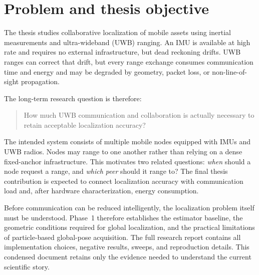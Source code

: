 \section{Problem and thesis objective}

The thesis studies collaborative localization of mobile assets using inertial measurements and ultra-wideband (UWB) ranging. An IMU is available at high rate and requires no external infrastructure, but dead reckoning drifts. UWB ranges can correct that drift, but every range exchange consumes communication time and energy and may be degraded by geometry, packet loss, or non-line-of-sight propagation.

The long-term research question is therefore:
\begin{quote}
How much UWB communication and collaboration is actually necessary to retain acceptable localization accuracy?
\end{quote}

The intended system consists of multiple mobile nodes equipped with IMUs and UWB radios. Nodes may range to one another rather than relying on a dense fixed-anchor infrastructure. This motivates two related questions: \emph{when} should a node request a range, and \emph{which peer} should it range to? The final thesis contribution is expected to connect localization accuracy with communication load and, after hardware characterization, energy consumption.

Before communication can be reduced intelligently, the localization problem itself must be understood. Phase~1 therefore establishes the estimator baseline, the geometric conditions required for global localization, and the practical limitations of particle-based global-pose acquisition. The full research report contains all implementation choices, negative results, sweeps, and reproduction details. This condensed document retains only the evidence needed to understand the current scientific story.
